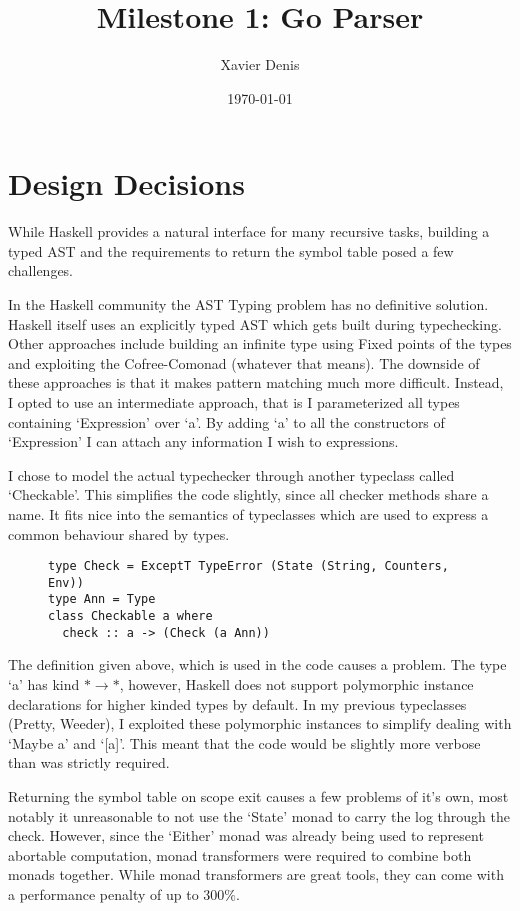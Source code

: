 \documentclass[11pt]{article}
\begin{document}

\title{Milestone 1: Go Parser}
\author{Xavier Denis}
\date{\today}
\maketitle

\section {Design Decisions}
While Haskell provides a natural interface for many recursive tasks, building a typed AST and the requirements to return the symbol table posed a few challenges. 

In the Haskell community the AST Typing problem has no definitive solution. Haskell itself uses an explicitly typed AST which gets built during typechecking. Other approaches include building an infinite type using Fixed points of the types and exploiting the Cofree-Comonad (whatever that means). The downside of these approaches is that it makes pattern matching much more difficult.  Instead, I opted to use an intermediate approach, that is I parameterized all types containing `Expression' over `a'. By adding `a' to all the constructors of `Expression' I can attach any information I wish to expressions.

I chose to model the actual typechecker through another typeclass called `Checkable'. This simplifies the code slightly, since all checker methods share a name. It fits nice into the semantics of typeclasses which are used to express a common behaviour shared by types.
\begin{figure}
\begin{lstlisting}
type Check = ExceptT TypeError (State (String, Counters, Env))
type Ann = Type
class Checkable a where
  check :: a -> (Check (a Ann))
\end{lstlisting}
\end{figure}

The definition given above, which is used in the code causes a problem. The type `a' has kind $* \rightarrow *$, however, Haskell does not support polymorphic instance declarations for higher kinded types by default. In my previous typeclasses (Pretty, Weeder), I exploited these polymorphic instances to simplify dealing with `Maybe a' and `[a]'. This meant that the code would be slightly more verbose than was strictly required. 

Returning the symbol table on scope exit causes a few problems of it's own, most notably it unreasonable to not use the `State' monad to carry the log through the check. However, since the `Either' monad was already being used to represent abortable computation, monad transformers were required to combine both monads together. While monad transformers are great tools, they can come with a performance penalty of up to $300\%$.
\end{document}
